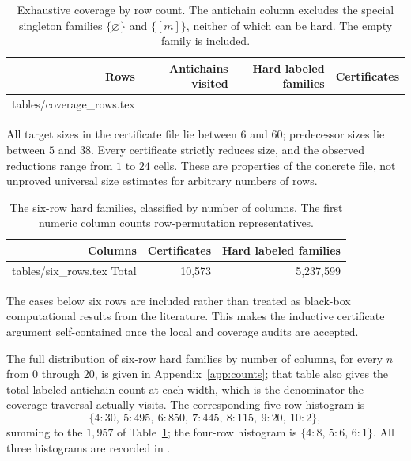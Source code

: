 \documentclass[11pt,letterpaper]{article}
\makeatletter
\numberwithin{equation}{section}
\theoremstyle{definition}
\theoremstyle{remark}
\newcommand{\code}[1]{\texttt{\detokenize{#1}}}
\let\inputrows\@@input
\makeatother
\begin{document}
\begin{table}[htbp]
\centering
\caption{Exhaustive coverage by row count. The antichain column excludes the
special singleton families $\{\varnothing\}$ and $\{[m]\}$, neither of
which can be hard. The empty family is included.}
\label{tab:coverage}
\begin{tabular}{rrrr}
\toprule
Rows & Antichains visited & Hard labeled families & Certificates \\
\midrule
\inputrows tables/coverage_rows.tex 
\bottomrule
\end{tabular}
\end{table}

All target sizes in the certificate file lie between $6$ and $60$;
predecessor sizes lie between $5$ and $38$. Every certificate strictly
reduces size, and the observed reductions range from $1$ to $24$ cells.
These are properties of the concrete file, not unproved universal size
estimates for arbitrary numbers of rows.

\begin{table}[htbp]
\centering
\caption{The six-row hard families, classified by number of columns.
The first numeric column counts row-permutation representatives.}
\label{tab:six-shapes}
\begin{tabular}{rrr}
\toprule
Columns & Certificates & Hard labeled families \\
\midrule
\inputrows tables/six_rows.tex 
\midrule
Total & 10,573 & 5,237,599 \\
\bottomrule
\end{tabular}
\end{table}

The cases below six rows are included rather than treated as black-box
computational results from the literature. This makes the inductive
certificate argument self-contained once the local and coverage audits
are accepted.

The full distribution of six-row hard families by number of columns, for
every $n$ from $0$ through $20$, is given in Appendix~\ref{app:counts}; that
table also gives the total labeled antichain count at each width, which is the
denominator the coverage traversal actually visits. The corresponding
five-row histogram is
\[
 \{4\!:\!30,\ 5\!:\!495,\ 6\!:\!850,\ 7\!:\!445,\ 8\!:\!115,\ 9\!:\!20,\
   10\!:\!2\},
\]
summing to the $1{,}957$ of Table~\ref{tab:coverage}; the four-row histogram
is $\{4\!:\!8,\,5\!:\!6,\,6\!:\!1\}$. All three histograms are recorded in
\code{audit/coverage.json}.
\end{document}

